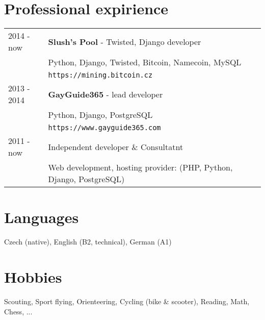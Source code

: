 \documentclass[12pt,a4paper]{article}
\begin{document}
\section*{Professional expirience}
\begin{tabular}{@{}p{2cm}l}
2014 - now & {\bf Slush's Pool} - Twisted, Django developer\\
 & Python, Django, Twisted, Bitcoin, Namecoin, MySQL\\
 & \texttt{https://mining.bitcoin.cz}\\
2013 - 2014 & {\bf GayGuide365} - lead developer\\
 & Python, Django, PostgreSQL\\
 & \texttt{https://www.gayguide365.com}\\
2011 - now & Independent developer \& Consultatnt\\
 & Web development, hosting provider: (PHP, Python, Django, PostgreSQL)\\
\end{tabular}

\section*{Languages}
Czech (native), English (B2, technical), German (A1)\\

\section*{Hobbies}
Scouting, Sport flying, Orienteering, Cycling (bike \& scooter), Reading, Math, Chess, ...
\\
\end{document}
